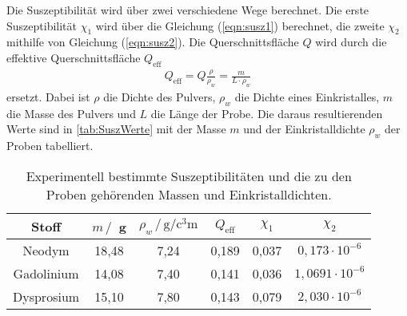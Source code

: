 \noindent
Die Suszeptibilität wird über zwei verschiedene Wege berechnet. Die erste Suszeptibilität $\chi_1$ wird über die Gleichung (\ref{eqn:susz1}) berechnet, die zweite $\chi_2$ mithilfe von Gleichung (\ref{eqn:susz2}).
Die Querschnittsfläche $Q$ wird durch die effektive Querschnittsfläche $Q_{\text{eff}}$
\begin{align*}
  Q_{\text{eff}} = Q\frac{\rho}{\rho_w} = \frac{m}{L\cdot\rho_w}
\end{align*}
ersetzt. Dabei ist $\rho$ die Dichte des Pulvers, $\rho_w$ die Dichte eines Einkristalles, $m$ die Masse des Pulvers und $L$ die Länge der Probe.
Die daraus resultierenden Werte sind in \autoref{tab:SuszWerte} mit der Masse $m$ und der Einkristalldichte $\rho_w$ der Proben tabelliert.
\begin{table}[H]
  \centering
  \caption{Experimentell bestimmte Suszeptibilitäten und die zu den Proben gehörenden Massen und Einkristalldichten.}
  \label{tab:SuszWerte}
  \begin{tabular}{c c c c c c}
    \toprule
    Stoff & $m \,/\,$ g & $\rho_w \, / \, \si{\gram\per\cubic\centi\meter}$ & $Q_{\text{eff}}$ & $\chi_1$ & $\chi_2$ \\
    \midrule
    Neodym & 18,48 & 7,24 & 0,189 & 0,037 & $0,173 \cdot 10^{-6}$  \\
    Gadolinium & 14,08 & 7,40 & 0,141 & 0,036 & $1,0691 \cdot 10^{-6}$ \\
    Dysprosium & 15,10 & 7,80 & 0,143 & 0,079 & $2,030 \cdot 10^{-6}$ \\
    \bottomrule
  \end{tabular}
\end{table}